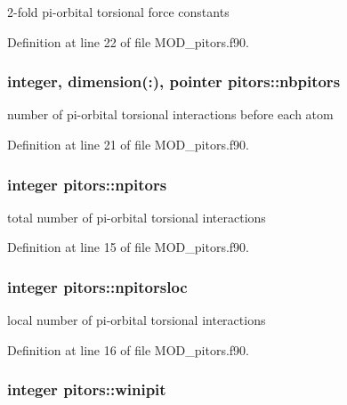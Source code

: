 2-\/fold pi-\/orbital torsional force constants 



Definition at line 22 of file M\-O\-D\-\_\-pitors.\-f90.

\hypertarget{classpitors_a53b9c40a373f8b7c84a14a469cc56488}{
\subsubsection[{nbpitors}]{\setlength{\rightskip}{0pt plus 5cm}integer, dimension(\-:), pointer pitors\-::nbpitors}}\label{classpitors_a53b9c40a373f8b7c84a14a469cc56488}


number of pi-\/orbital torsional interactions before each atom 



Definition at line 21 of file M\-O\-D\-\_\-pitors.\-f90.

\hypertarget{classpitors_adba60d0e3c4560af9ac8c900f964317e}{
\subsubsection[{npitors}]{\setlength{\rightskip}{0pt plus 5cm}integer pitors\-::npitors}}\label{classpitors_adba60d0e3c4560af9ac8c900f964317e}


total number of pi-\/orbital torsional interactions 



Definition at line 15 of file M\-O\-D\-\_\-pitors.\-f90.

\hypertarget{classpitors_a9704e23ab1f75ad5103e3d73edca9b56}{
\subsubsection[{npitorsloc}]{\setlength{\rightskip}{0pt plus 5cm}integer pitors\-::npitorsloc}}\label{classpitors_a9704e23ab1f75ad5103e3d73edca9b56}


local number of pi-\/orbital torsional interactions 



Definition at line 16 of file M\-O\-D\-\_\-pitors.\-f90.

\hypertarget{classpitors_a8c58b89806225b8f5f4a47400419cef5}{
\subsubsection[{winipit}]{\setlength{\rightskip}{0pt plus 5cm}integer pitors\-::winipit}}\label{classpitors_a8c58b89806225b8f5f4a47400419cef5}


